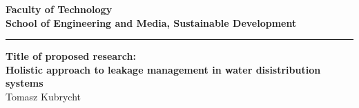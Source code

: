 
\begin{titlepage}
  \begin{figure}[tp]
    \centering
  \end{figure}
  \begin{center}
    \textbf{{\Large Faculty of Technology }}\\ \vspace{0.2cm}
    \textbf{{\Large School of Engineering and Media, Sustainable Development }}\\ \vspace{0.8cm}
    \rule{150mm}{0.5mm}

    \vspace{1.2cm}

    {\bf\LARGE Title of proposed research:}\\ \vspace{1.3cm} %
    {\bf\LARGE  Holistic approach to leakage management in water disistribution systems}\\ \vspace{0.8cm} %
    \vspace{2cm}
    {\LARGE Tomasz Kubrycht }\\


\end{center}
\end{titlepage}
